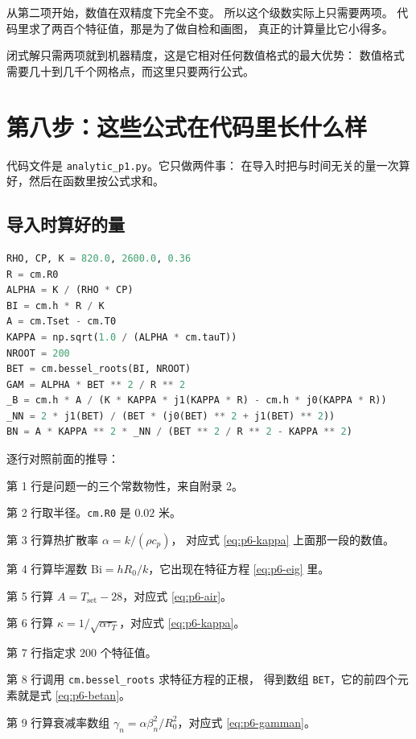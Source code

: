 从第二项开始，数值在双精度下完全不变。
所以这个级数实际上只需要两项。
代码里求了两百个特征值，那是为了做自检和画图，
真正的计算量比它小得多。

\begin{keypoint}
闭式解只需两项就到机器精度，这是它相对任何数值格式的最大优势：
数值格式需要几十到几千个网格点，而这里只要两行公式。
\end{keypoint}

\section{第八步：这些公式在代码里长什么样}

代码文件是 \texttt{analytic\_p1.py}。它只做两件事：
在导入时把与时间无关的量一次算好，然后在函数里按公式求和。

\subsection{导入时算好的量}

\begin{lstlisting}[language=Python]
RHO, CP, K = 820.0, 2600.0, 0.36
R = cm.R0
ALPHA = K / (RHO * CP)
BI = cm.h * R / K
A = cm.Tset - cm.T0
KAPPA = np.sqrt(1.0 / (ALPHA * cm.tauT))
NROOT = 200
BET = cm.bessel_roots(BI, NROOT)
GAM = ALPHA * BET ** 2 / R ** 2
_B = cm.h * A / (K * KAPPA * j1(KAPPA * R) - cm.h * j0(KAPPA * R))
_NN = 2 * j1(BET) / (BET * (j0(BET) ** 2 + j1(BET) ** 2))
BN = A * KAPPA ** 2 * _NN / (BET ** 2 / R ** 2 - KAPPA ** 2)
\end{lstlisting}

逐行对照前面的推导：

第 1 行是问题一的三个常数物性，来自附录 2。

第 2 行取半径。\texttt{cm.R0} 是 $0.02$ 米。

第 3 行算热扩散率 $\alpha=k/(\rho c_p)$，
对应式 \eqref{eq:p6-kappa} 上面那一段的数值。

第 4 行算毕渥数 $\mathrm{Bi}=hR_0/k$，它出现在特征方程 \eqref{eq:p6-eig} 里。

第 5 行算 $A=T_{\mathrm{set}}-28$，对应式 \eqref{eq:p6-air}。

第 6 行算 $\kappa=1/\sqrt{\alpha\tau_T}$，对应式 \eqref{eq:p6-kappa}。

第 7 行指定求 $200$ 个特征值。

第 8 行调用 \texttt{cm.bessel\_roots} 求特征方程的正根，
得到数组 \texttt{BET}，它的前四个元素就是式 \eqref{eq:p6-betan}。

第 9 行算衰减率数组 $\gamma_n=\alpha\beta_n^2/R_0^2$，对应式 \eqref{eq:p6-gamman}。

